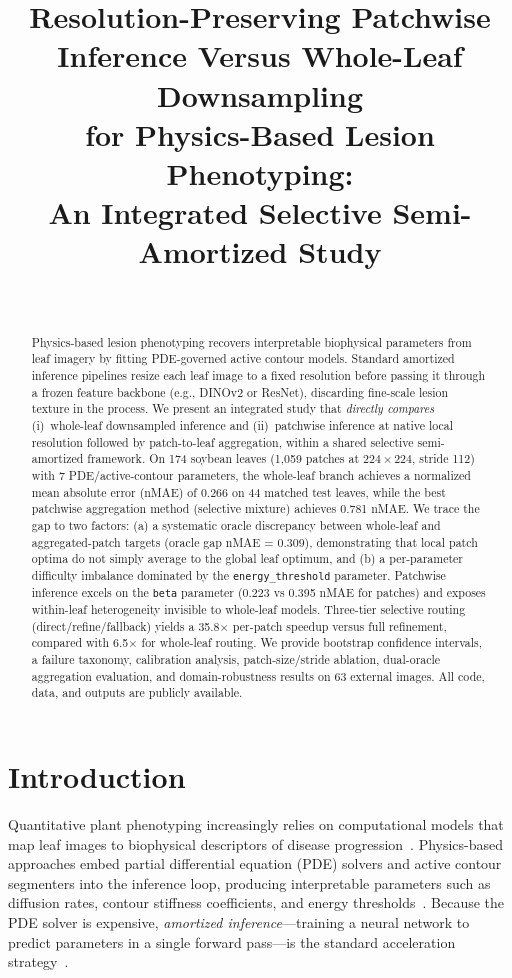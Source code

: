 \documentclass[11pt]{article}
\title{Resolution-Preserving Patchwise Inference Versus Whole-Leaf Downsampling\\for Physics-Based Lesion Phenotyping:\\An Integrated Selective Semi-Amortized Study}
\author{~}
\date{}
\begin{document}
\maketitle

\begin{abstract}
Physics-based lesion phenotyping recovers interpretable biophysical parameters from leaf imagery by fitting PDE-governed active contour models.  Standard amortized inference pipelines resize each leaf image to a fixed resolution before passing it through a frozen feature backbone (e.g., DINOv2 or ResNet), discarding fine-scale lesion texture in the process.  We present an integrated study that \emph{directly compares} (i)~whole-leaf downsampled inference and (ii)~patchwise inference at native local resolution followed by patch-to-leaf aggregation, within a shared selective semi-amortized framework.  On 174 soybean leaves (1{,}059 patches at $224{\times}224$, stride 112) with 7 PDE/active-contour parameters, the whole-leaf branch achieves a normalized mean absolute error (nMAE) of 0.266 on 44 matched test leaves, while the best patchwise aggregation method (selective mixture) achieves 0.781 nMAE.  We trace the gap to two factors: (a) a systematic oracle discrepancy between whole-leaf and aggregated-patch targets (oracle gap nMAE = 0.309), demonstrating that local patch optima do not simply average to the global leaf optimum, and (b) a per-parameter difficulty imbalance dominated by the \texttt{energy\_threshold} parameter.  Patchwise inference excels on the \texttt{beta} parameter (0.223 vs 0.395 nMAE for patches) and exposes within-leaf heterogeneity invisible to whole-leaf models.  Three-tier selective routing (direct/refine/fallback) yields a 35.8$\times$ per-patch speedup versus full refinement, compared with 6.5$\times$ for whole-leaf routing.  We provide bootstrap confidence intervals, a failure taxonomy, calibration analysis, patch-size/stride ablation, dual-oracle aggregation evaluation, and domain-robustness results on 63 external images.  All code, data, and outputs are publicly available.
\end{abstract}

\section{Introduction}
\label{sec:intro}

Quantitative plant phenotyping increasingly relies on computational models that map leaf images to biophysical descriptors of disease progression~\citep{singh2021plantdoc,mahlein2016plant}.  Physics-based approaches embed partial differential equation (PDE) solvers and active contour segmenters into the inference loop, producing interpretable parameters such as diffusion rates, contour stiffness coefficients, and energy thresholds~\citep{raissi2019physics,karniadakis2021physics}.  Because the PDE solver is expensive, \emph{amortized inference}---training a neural network to predict parameters in a single forward pass---is the standard acceleration strategy~\citep{amos2023tutorial,cranmer2020frontier}.
\end{document}
